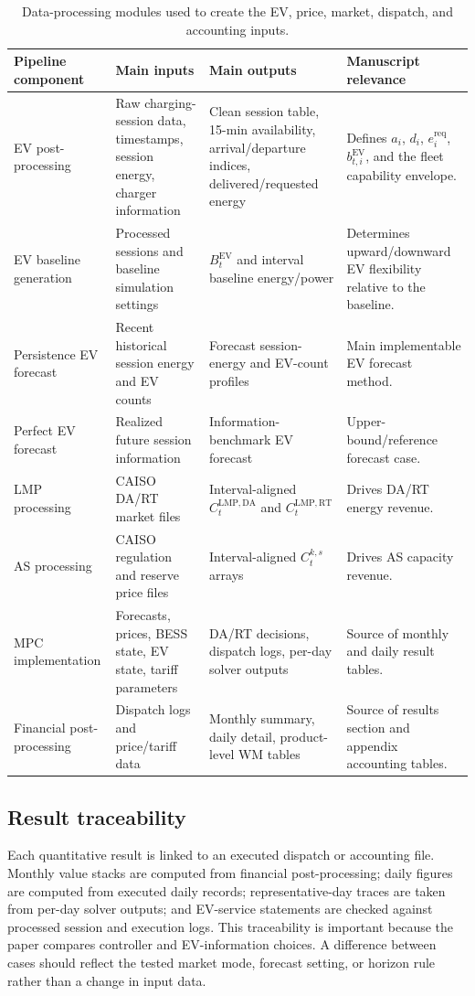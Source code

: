 \documentclass[final,5p,times]{elsarticle}
\newcommand{\EV}{\mathrm{EV}}
\newcommand{\DA}{\mathrm{DA}}
\newcommand{\RT}{\mathrm{RT}}
\newcommand{\req}{\mathrm{req}}
\begin{document}
\begin{table}[!t]
\centering
\caption{Data-processing modules used to create the EV, price, market, dispatch, and accounting inputs.}
\label{tab:data_pipeline}
\scriptsize
\begin{tabularx}{\textwidth}{@{}p{}p{}p{}X@{}}
\toprule
Pipeline component & Main inputs & Main outputs & Manuscript relevance \\
\midrule
EV post-processing & Raw charging-session data, timestamps, session energy, charger information & Clean session table, 15-min availability, arrival/departure indices, delivered/requested energy & Defines $a_i$, $d_i$, $e_i^{\req}$, $b_{t,i}^{\EV}$, and the fleet capability envelope.\\
EV baseline generation & Processed sessions and baseline simulation settings & $B_t^{\EV}$ and interval baseline energy/power & Determines upward/downward EV flexibility relative to the baseline.\\
Persistence EV forecast & Recent historical session energy and EV counts & Forecast session-energy and EV-count profiles & Main implementable EV forecast method.\\
Perfect EV forecast & Realized future session information & Information-benchmark EV forecast & Upper-bound/reference forecast case.\\
LMP processing & CAISO DA/RT market files & Interval-aligned $C_t^{\mathrm{LMP},\DA}$ and $C_t^{\mathrm{LMP},\RT}$ & Drives DA/RT energy revenue.\\
AS processing & CAISO regulation and reserve price files & Interval-aligned $C_t^{k,s}$ arrays & Drives AS capacity revenue.\\
MPC implementation & Forecasts, prices, BESS state, EV state, tariff parameters & DA/RT decisions, dispatch logs, per-day solver outputs & Source of monthly and daily result tables.\\
Financial post-processing & Dispatch logs and price/tariff data & Monthly summary, daily detail, product-level WM tables & Source of results section and appendix accounting tables.\\
\bottomrule
\end{tabularx}
\end{table}

\subsection{Result traceability}
Each quantitative result is linked to an executed dispatch or accounting file. Monthly value stacks are computed from financial post-processing; daily figures are computed from executed daily records; representative-day traces are taken from per-day solver outputs; and EV-service statements are checked against processed session and execution logs. This traceability is important because the paper compares controller and EV-information choices. A difference between cases should reflect the tested market mode, forecast setting, or horizon rule rather than a change in input data.
\end{document}
